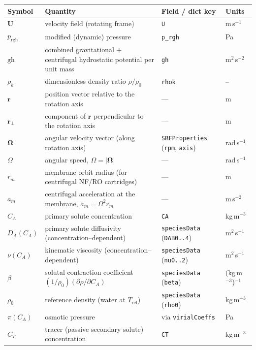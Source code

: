 \documentclass[11pt,a4paper]{article}
\begin{document}
	\renewcommand{\arraystretch}{1.15}
	\begin{tabular}{@{}lp{7cm}ll@{}}
		\toprule
		Symbol & Quantity & Field / dict key & Units\\
		\midrule
		$\boldsymbol{U}$ & velocity field (rotating frame) & \texttt{U} & m\,s$^{-1}$\\
		$p_\mathrm{rgh}$ & modified (dynamic) pressure & \texttt{p\_rgh} & Pa\\
		$\mathrm{gh}$ & combined gravitational + centrifugal hydrostatic potential per unit mass & \texttt{gh} & m$^2$\,s$^{-2}$\\
		$\rho_k$ & dimensionless density ratio $\rho/\rho_0$ & \texttt{rhok} & --\\
		$\mathbf{r}$ & position vector relative to the rotation axis & --- & m\\
		$\mathbf{r}_{\!\perp}$ & component of $\mathbf{r}$ perpendicular to the rotation axis & --- & m\\
		$\boldsymbol{\Omega}$ & angular velocity vector (along rotation axis) & \texttt{SRFProperties} (\texttt{rpm}, \texttt{axis}) & rad\,s$^{-1}$\\
		$\Omega$ & angular speed, $\Omega = \lvert\boldsymbol{\Omega}\rvert$ & --- & rad\,s$^{-1}$\\
		$r_m$ & membrane orbit radius (for centrifugal NF/RO cartridges) & --- & m\\
		$a_m$ & centrifugal acceleration at the membrane, $a_m = \Omega^2 r_m$ & --- & m\,s$^{-2}$\\
		\midrule
		$C_A$ & primary solute concentration & \texttt{CA} & kg\,m$^{-3}$\\
		$D_A(C_A)$ & primary solute diffusivity (concentration--dependent) & \texttt{speciesData} (\texttt{DAB0..4}) & m$^2$\,s$^{-1}$\\
		$\nu(C_A)$ & kinematic viscosity (concentration--dependent) & \texttt{speciesData} (\texttt{nu0..2}) & m$^2$\,s$^{-1}$\\
		$\beta$ & solutal contraction coefficient $(1/\rho_0)(\partial\rho/\partial C_A)$ & \texttt{speciesData} (\texttt{beta}) & (kg\,m$^{-3}$)$^{-1}$\\
		$\rho_0$ & reference density (water at $T_\mathrm{ref}$) & \texttt{speciesData} (\texttt{rho0}) & kg\,m$^{-3}$\\
		$\pi(C_A)$ & osmotic pressure & via \texttt{virialCoeffs} & Pa\\
		\midrule
		$C_T$ & tracer (passive secondary solute) concentration & \texttt{CT} & kg\,m$^{-3}$\\

\end{tabular}
\end{document}
